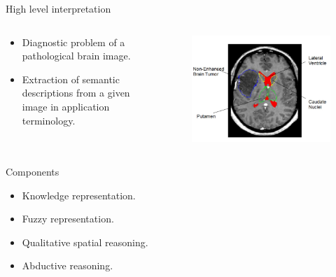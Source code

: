 \documentclass{beamer}
\begin{document}
\begin{frame}{High level interpretation}
\begin{columns}
\begin{column}{0.6\textwidth}
 \begin{itemize}
  \item Diagnostic problem of a pathological brain image.
  \item Extraction of semantic descriptions from a given image in application terminology.
 \end{itemize}
\end{column}

\begin{column}{0.4\textwidth}
	\begin{figure}
	\includegraphics[width=\textwidth]{images/cerebrale.png}
	\end{figure}\vspace{-0.5cm}
	\end{column}
\end{columns}

\begin{block}{Components}
\centering
 \begin{itemize}
  \item Knowledge representation.
  \item Fuzzy representation.
  \item Qualitative spatial reasoning.
  \item Abductive reasoning.
 \end{itemize}
\end{block}

\end{frame}
\end{document}

